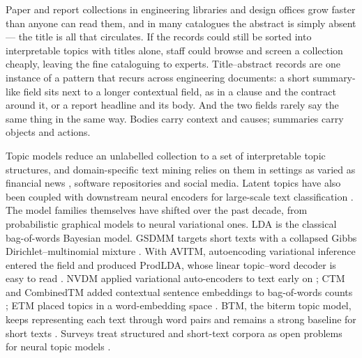 \documentclass[pdflatex,sn-basic]{sn-jnl}
\begin{document}
Paper and report collections in engineering libraries and design offices grow faster than anyone
can read them, and in many catalogues the abstract is simply absent --- the title is all that
circulates. If the records could still be sorted into interpretable topics with titles alone,
staff could browse and screen a collection cheaply, leaving the fine cataloguing to experts.
Title--abstract records are one instance of a pattern that recurs across engineering documents:
a short summary-like field sits next to a longer contextual field, as in a clause and the
contract around it, or a report headline and its body. And the two fields rarely say the same
thing in the same way. Bodies carry context and causes; summaries carry objects and actions.

Topic models reduce an unlabelled collection to a set of interpretable topic structures, and
domain-specific text mining relies on them in settings as varied as financial news
\cite{garciamendez2023lda}, software repositories and social media. Latent topics have also been coupled with downstream neural
encoders for large-scale text classification \cite{qin2024tae}. The model families themselves
have shifted over the past decade, from probabilistic graphical models to neural variational
ones. LDA \cite{blei2003lda} is the classical bag-of-words Bayesian model. GSDMM targets short
texts with a collapsed Gibbs Dirichlet--multinomial mixture \cite{yin2014gsdmm}. With AVITM,
autoencoding variational inference entered the field and produced ProdLDA, whose linear
topic--word decoder is easy to read \cite{srivastava2017avitm}. NVDM applied variational
auto-encoders to text early on \cite{miao2016nvdm}; CTM and CombinedTM added contextual sentence
embeddings to bag-of-words counts \cite{bianchi2021ctm}; ETM placed topics in a word-embedding
space \cite{dieng2020etm}. BTM, the biterm topic model, keeps representing each text through
word pairs and remains a strong baseline for short texts \cite{yan2013btm}. Surveys treat
structured and short-text corpora as open problems for neural topic models \cite{wu2024survey}.
\end{document}
